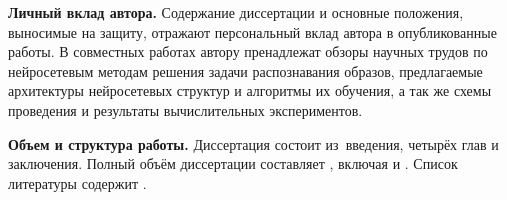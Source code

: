 \textbf{Личный вклад автора.} Содержание диссертации и основные положения, выносимые на защиту, отражают персональный вклад автора в опубликованные работы. В совместных работах автору пренадлежат обзоры научных трудов по нейросетевым методам решения задачи распознавания образов, предлагаемые архитектуры нейросетевых структур и алгоритмы их обучения, а так же схемы проведения и результаты вычислительных экспериментов.

\textbf{Объем и структура работы.} Диссертация состоит из~введения, четырёх глав и заключения. Полный объём диссертации составляет , включая  и . Список литературы содержит .
